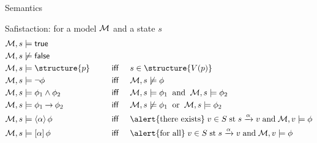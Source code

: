 \documentclass[aspectratio=169]{beamer}
\begin{document}
\begin{slide}{Semantics}\label{s:13}
\small
\begin{block}{Safistaction: for a model $\mathcal{M}$ and a state $s$}
\begin{align*}
\ger{M}, s & \models \true &&\\
\ger{M}, s & \not \models  \false &&\\
\ger{M}, s & \models  \structure{p} &  \text{~~~ \textsf{iff} ~~~}  & s \in \structure{V(p)}\\
\ger{M}, s  & \models \neg \phi  & \text{~~~ \textsf{iff} ~~~} & \ger{M}, s  \not \models \phi \\
\ger{M}, s & \models \phi_1 \land \phi_2  &\text{~~~ \textsf{iff} ~~~} & \ger{M}, s \models  \phi_1 \;\; \text{and}\;\;
                                                   \ger{M}, s \models  \phi_2 \\
\ger{M}, s & \models \phi_1 \impp \phi_2 & \text{~~~ \textsf{iff} ~~~} & \ger{M}, s \not \models \phi_1  \;\; \text{or}\;\; 
                                                  \ger{M}, s \models \phi_2 \\
\ger{M}, s  &\models \evm{\alpha}{\phi} & \text{ ~~~ \textsf{iff} ~~~} &
\text{\alert{there exists}}\; v \in S \;\text{st}\; s \xrightarrow{\alpha} v\; \text{and}\; \ger{M}, v \models \phi\\
\ger{M}, s & \models \alm{\alpha}{\phi} & \text{~~~ \textsf{iff} ~~~} &
\text{\alert{for all}}\; v \in S \; \text{st}\; s \xrightarrow{\alpha} v\; \text{and}\; \ger{M}, v \models \phi\\
\end{align*}
\end{block}
\end{slide}
\end{document}
